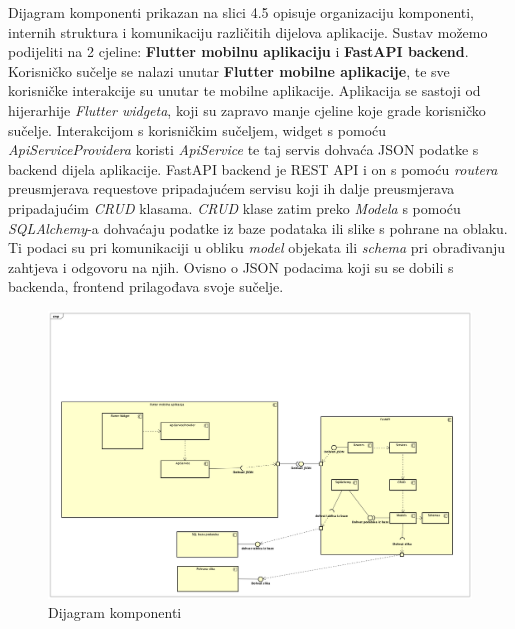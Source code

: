 			 {Dijagram komponenti prikazan na slici 4.5 opisuje organizaciju komponenti, internih struktura i komunikaciju različitih dijelova aplikacije. Sustav možemo podijeliti na 2 cjeline: \textbf{Flutter mobilnu aplikaciju} i \textbf{FastAPI backend}. Korisničko sučelje se nalazi unutar \textbf{Flutter mobilne aplikacije}, te sve korisničke interakcije su unutar te mobilne aplikacije. Aplikacija se sastoji od hijerarhije \textit{Flutter widgeta}, koji su zapravo manje cjeline koje grade korisničko sučelje. Interakcijom s korisničkim sučeljem, widget s pomoću \textit{ApiServiceProvidera} koristi \textit{ApiService} te taj servis dohvaća JSON podatke s backend dijela aplikacije. FastAPI backend je REST API i on s pomoću \textit{routera} preusmjerava requestove pripadajućem servisu koji ih dalje preusmjerava pripadajućim \textit{CRUD} klasama. \textit{CRUD} klase zatim preko \textit{Modela} s pomoću \textit{SQLAlchemy}-a dohvaćaju podatke iz baze podataka ili slike s pohrane na oblaku. Ti podaci su pri komunikaciji u obliku \textit{model} objekata ili \textit{schema} pri obrađivanju zahtjeva i odgovoru na njih. Ovisno o JSON podacima koji su se dobili s backenda, frontend prilagođava svoje sučelje.}
			 \begin{figure}[H]
			 	\includegraphics[width=\textwidth]{slike/dijagramKomponenti.png}
			 	\caption{Dijagram komponenti}
			 	\label{fig:dijagramKomponenti}
			 \end{figure}
